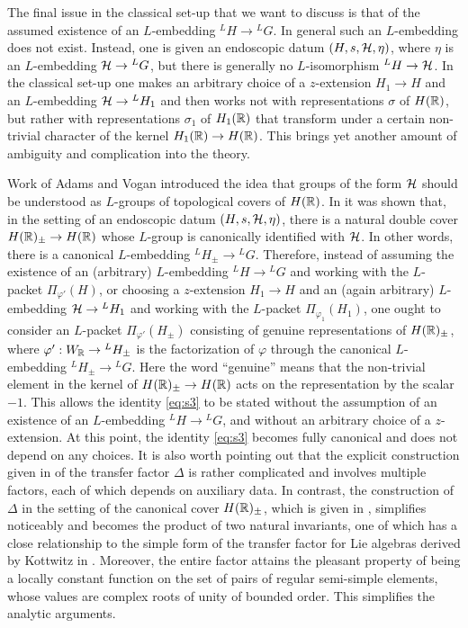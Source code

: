 \documentclass{article}
\theoremstyle{definition}
\numberwithin{equation}{section}
\renewcommand{\-}{\hyp{}}
\begin{document}
The final issue in the classical set-up that we want to discuss is that of the assumed existence of an $L$\-embedding $^LH \to {^LG}$. In general such an $L$\-embedding does not exist. Instead, one is given an endoscopic datum $(H,s,\mathcal{H},\eta)$, where $\eta$ is an $L$\-embedding $\mathcal{H} \to {^LG}$, but there is generally no $L$\-isomorphism $^LH \to \mathcal{H}$. In the classical set-up one makes an arbitrary choice of a $z$-extension $H_1 \to H$ and an $L$\-embedding $\mathcal{H} \to {^LH_1}$ and then works not with representations $\sigma$ of $H(\mathbb{R})$, but rather with representations $\sigma_1$ of $H_1(\mathbb{R})$ that transform under a certain non-trivial character of the kernel $H_1(\mathbb{R}) \to H(\mathbb{R})$. This brings yet another amount of ambiguity and complication into the theory.

Work of Adams and Vogan \cite{AV92} introduced the idea that groups of the form $\mathcal{H}$ should be understood as $L$\-groups of topological covers of $H(\mathbb{R})$. In \cite{KalHDC} it was shown that, in the setting of an endoscopic datum $(H,s,\mathcal{H},\eta)$, there is a natural double cover $H(\mathbb{R})_\pm \to H(\mathbb{R})$ whose $L$\-group is canonically identified with $\mathcal{H}$. In other words, there is a canonical $L$\-embedding $^LH_\pm \to {^LG}$. Therefore, instead of assuming the existence of an  (arbitrary) $L$\-embedding $^LH \to {^LG}$ and working with the $L$\-packet $\Pi_{\varphi'}(H)$, or choosing a $z$-extension $H_1 \to H$ and an (again arbitrary) $L$\-embedding $\mathcal{H} \to {^LH_1}$ and working with the $L$\-packet $\Pi_{\varphi_1}(H_1)$, one ought to consider an $L$\-packet $\Pi_{\varphi'}(H_\pm)$ consisting of genuine representations of $H(\mathbb{R})_\pm$, where $\varphi' : W_{\mathbb{R}} \to {^LH_\pm}$ is the factorization of $\varphi$ through the canonical $L$\-embedding $^LH_\pm \to {^LG}$. Here the word ``genuine'' means that the non-trivial element in the kernel of $H(\mathbb{R})_\pm \to H(\mathbb{R})$ acts on the representation by the scalar $-1$. This allows the identity \eqref{eq:s3} to be stated without the assumption of an existence of an $L$\-embedding $^LH \to {^LG}$, and without an arbitrary choice of a $z$-extension. At this point, the identity \eqref{eq:s3} becomes fully canonical and does not depend on any choices. It is also worth pointing out that the  explicit construction given in \cite{LS87} of the transfer factor $\Delta$ is rather complicated and involves multiple factors, each of which depends on auxiliary data. In contrast, the construction of $\Delta$ in the setting of the canonical cover $H(\mathbb{R})_\pm$, which is given in \cite[\S4.3]{KalHDC}, simplifies noticeably and becomes the product of two natural invariants, one of which has a close relationship to the simple form of the transfer factor for Lie algebras derived by Kottwitz in \cite{Kot99}. Moreover, the entire factor attains the pleasant property of being a locally constant function on the set of pairs of regular semi-simple elements, whose values are complex roots of unity of bounded order. This simplifies the analytic arguments.
\end{document}
